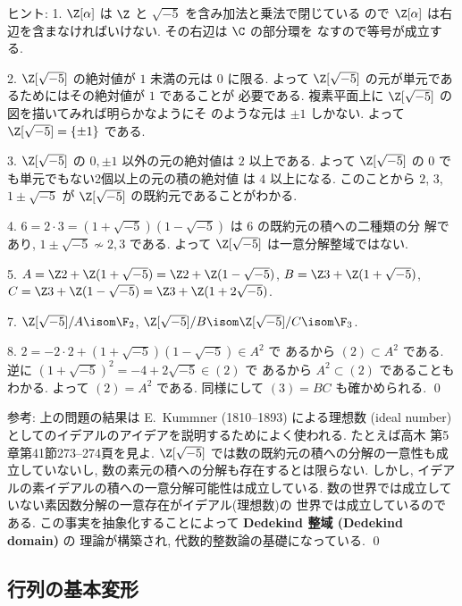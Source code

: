 \documentclass[12pt,twoside]{jarticle}
\begin{document}
\noindent
ヒント: 1. $\Z[\alpha]$ は $\Z$ と $\sqrt{-5}$ を含み加法と乗法で閉じている
ので $\Z[\alpha]$ は右辺を含まなければいけない.  その右辺は $\C$ の部分環を
なすので等号が成立する. 

2. $\Z[\sqrt{-5}]$ の絶対値が $1$ 未満の元は $0$ に限る.
よって $\Z[\sqrt{-5}]$ の元が単元であるためにはその絶対値が $1$ であることが
必要である.  複素平面上に $\Z[\sqrt{-5}]$ の図を描いてみれば明らかなようにそ
のような元は $\pm1$ しかない.  よって $\Z[\sqrt{-5}] = \{\pm1\}$ である.

3. $\Z[\sqrt{-5}]$ の $0,\pm1$ 以外の元の絶対値は $2$ 以上である. 
よって $\Z[\sqrt{-5}]$ の $0$ でも単元でもない2個以上の元の積の絶対値
は $4$ 以上になる.  このことから $2$, $3$, $1\pm\sqrt{-5}$ が $\Z[\sqrt{-5}]$ 
の既約元であることがわかる.  

4. $6=2\cdot 3=(1+\sqrt{-5})(1-\sqrt{-5})$ は $6$ の既約元の積への二種類の分
解であり,  $1\pm\sqrt{-5}\not\sim 2,3$ である. 
よって $\Z[\sqrt{-5}]$ は一意分解整域ではない.

5. $A=\Z 2+\Z(1+\sqrt{-5})=\Z 2+\Z(1-\sqrt{-5})$, 
$B=\Z 3+\Z(1+\sqrt{-5})$,
$C=\Z 3+\Z(1-\sqrt{-5})=\Z 3+\Z(1+2\sqrt{-5})$.

7. $\Z[\sqrt{-5}]/A\isom\F_2$,
$\Z[\sqrt{-5}]/B\isom\Z[\sqrt{-5}]/C\isom\F_3$.

8. $2=-2\cdot 2+(1+\sqrt{-5})(1-\sqrt{-5})\in A^2$ で
あるから $(2)\subset A^2$ である.
逆に $(1+\sqrt{-5})^2=-4+2\sqrt{-5}\in(2)$ で
あるから $A^2\subset(2)$ であることもわかる.
よって $(2)=A^2$ である.
同様にして $(3)=BC$ も確かめられる.
\qed

\medskip
\noindent
参考: 上の問題の結果は E.~Kummner (1810--1893) による理想数 (ideal number) 
としてのイデアルのアイデアを説明するためによく使われる. 
たとえば高木 \cite{takagi2} 第5章第41節273--274頁を見よ.
$\Z[\sqrt{-5}]$ では数の既約元の積への分解の一意性も成立していないし, 
数の素元の積への分解も存在するとは限らない. しかし, 
イデアルの素イデアルの積への一意分解可能性は成立している.
数の世界では成立していない素因数分解の一意存在がイデアル(理想数)の
世界では成立しているのである.
この事実を抽象化することによって {\bf Dedekind 整域 (Dedekind domain)} の
理論が構築され, 代数的整数論の基礎になっている.
\qed


\subsection{行列の基本変形}
\label{sec:fundamental-operation}
\end{document}
